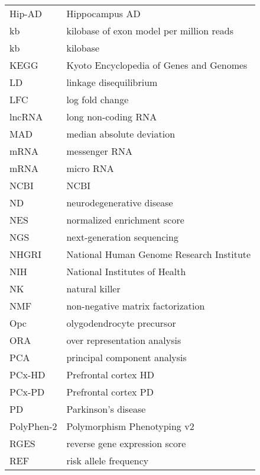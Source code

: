 \begin{table}[!ht]
\begin{tabular}{ll}
Hip-AD     & Hippocampus AD                           \\
kb         & kilobase of exon model per million reads \\
kb         & kilobase                                 \\
KEGG       & Kyoto Encyclopedia of Genes and Genomes  \\
LD         & linkage disequilibrium                   \\
LFC        & log fold change                          \\
lncRNA     & long non-coding RNA                      \\
MAD        & median absolute deviation                \\
mRNA       & messenger RNA                            \\
mRNA       & micro RNA                                \\
NCBI       & NCBI                                     \\
ND         & neurodegenerative disease                \\
NES        & normalized enrichment score              \\
NGS        & next-generation sequencing               \\
NHGRI      & National Human Genome Research Institute \\
NIH        & National Institutes of Health            \\
NK         & natural killer                           \\
NMF        & non-negative matrix factorization        \\
Opc        & olygodendrocyte precursor                \\
ORA        & over representation analysis             \\
PCA        & principal component analysis             \\
PCx-HD     & Prefrontal cortex HD                     \\
PCx-PD     & Prefrontal cortex PD                     \\
PD         & Parkinson's disease                      \\
PolyPhen-2 & Polymorphism Phenotyping v2              \\
RGES       & reverse gene expression score            \\
REF        & risk allele frequency                    \\

\end{tabular}
\end{table}
